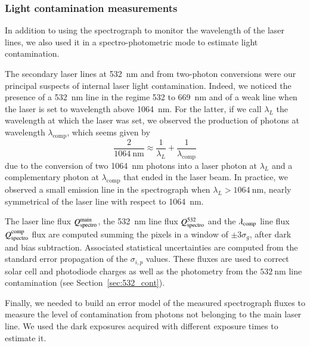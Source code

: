 \subsubsection{Light contamination measurements}
\label{lightcontamination}
In addition to using the spectrograph to monitor the wavelength of the laser lines, we also used it in a spectro-photometric mode to estimate light contamination.


The secondary laser lines at \SI{532}{\nm} and from two-photon conversions were our principal suspects of internal laser light contamination. Indeed, we noticed the presence of a \SI{532}{\nm} line in the regime 532 to \SI{669}{\nm} and of a weak line when the laser is set to wavelength above \SI{1064}{\nm}. For the latter, if we call $\lambda_L$ the wavelength at which the laser was set, we observed the production of photons at wavelength $\lambda_{\text{comp}}$, which seems given by
\begin{equation}
 \frac{2}{\SI{1064}{\nm}} \approx \frac{1}{\lambda_L} + \frac{1}{\lambda_{\text{comp}}}
 \end{equation} 
 due to the conversion of two \SI{1064}{\nm} photons into a laser photon at $\lambda_L$ and a complementary photon at $\lambda_{\text{comp}}$ that ended in the laser beam. In practice, we observed a small emission line in the spectrograph when $\lambda_L > \SI{1064}{\nm}$, nearly symmetrical of the laser line with respect to \SI{1064}{\nm}.

The laser line flux $Q_{\mathrm{spectro}}^{\mathrm{main}}$, the \SI{532}{\nm} line flux $Q_{\mathrm{spectro}}^{532}$ and the $\lambda_{\rm comp}$ line flux $Q_{\mathrm{spectro}}^{\rm comp}$ flux are computed summing the pixels in a window of $\pm 3 \sigma_g$, after dark and bias subtraction. Associated statistical uncertainties are computed from the standard error propagation of the $\sigma_{i,p}$ values. These fluxes are used to correct solar cell and photodiode charges as well as the \SD photometry from the $\SI{532}{\nm}$ line contamination (see Section~\ref{sec:532_cont}).  %

 
Finally, we needed to build an error model of the measured spectrograph fluxes to measure the level of contamination from photons not belonging to the main laser line. We used the dark exposures acquired with different exposure times to estimate it.

